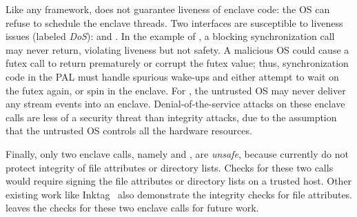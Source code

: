 Like any \sgx{} framework, \graphenesgx{} does not guarantee liveness of enclave code: the OS can refuse to schedule the enclave threads.
Two interfaces are susceptible to liveness issues (labeled {\em DoS}):  and .
In the example of , a blocking synchronization call may never return, violating liveness but not safety.
A malicious OS could cause a futex call to return prematurely or corrupt the futex value; thus, 
synchronization code in the PAL
must handle spurious wake-ups and either attempt to wait on the futex again, or spin in the enclave.
For , the untrusted OS may never deliver any stream events into an enclave.
Denial-of-the-service attacks on these enclave calls
are less of a security threat
than integrity attacks, due to the assumption that the untrusted OS controls all the hardware resources.

Finally, only two enclave calls, namely  and , are {\em unsafe}, because \graphenesgx{} currently do not protect
integrity of file attributes or directory lists.
Checks for these two calls would require signing the file attributes or directory lists
on a trusted host.
Other existing work like Inktag~\cite{inktag} also demonstrate the integrity checks for file attributes.
\graphenesgx{} leaves the checks for these two enclave calls
for future work.



 



